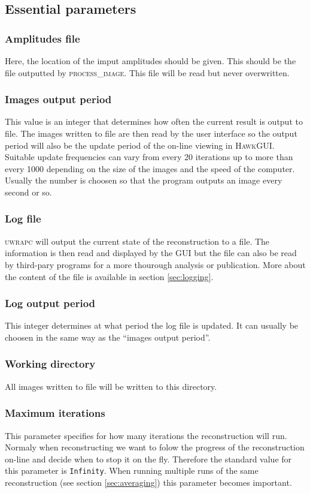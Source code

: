 \documentclass[11pt,a4paper]{article}
\newcommand{\hawk}[1]{\textsc{#1}}
\newcommand{\com}[1]{\texttt{#1}}
\begin{document}
\subsection{Essential parameters}
\subsubsection{Amplitudes file}
Here, the location of the imput amplitudes should be given. This should be the file outputted by \hawk{process\_image}. This file will be read but never overwritten. 

\subsubsection{Images output period}
This value is an integer that determines how often the current result is output to file. The images written to file are then read by the user interface so the output period will also be the update period of the on-line viewing in \hawk{HawkGUI}. Suitable update frequencies can vary from every 20 iterations up to more than every 1000 depending on the size of the images and the speed of the computer. Usually the number is choosen so that the program outputs an image every second or so.

\subsubsection{Log file}
\hawk{uwrapc} will output the current state of the reconstruction to a file. The information is then read and displayed by the GUI but the file can also be read by third-pary programs for a more thourough analysis or publication. More about the content of the file is available in section \ref{sec:logging}.

\subsubsection{Log output period}
This integer determines at what period the log file is updated. It can usually be choosen in the same way as the ``images output period''.

\subsubsection{Working directory}
All images written to file will be written to this directory.

\subsubsection{Maximum iterations}
This parameter specifies for how many iterations the reconstruction will run. Normaly when reconstructing we want to folow the progress of the reconstruction on-line and decide when to stop it on the fly. Therefore the standard value for this parameter is \com{Infinity}. When running multiple runs of the same reconstruction (see section \ref{sec:averaging}) this parameter becomes important.
\end{document}
